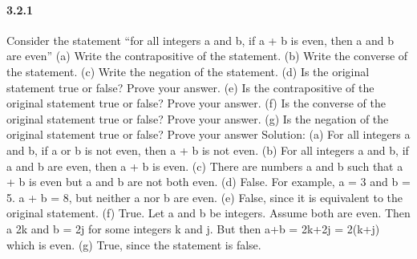 \documentclass{article}
\begin{document}
\paragraph{3.2.1}
Consider the statement “for all integers a and b, if a + b is even, then a
and b are even”\newline
(a) Write the contrapositive of the statement.\newline
(b) Write the converse of the statement.\newline
(c) Write the negation of the statement.\newline
(d) Is the original statement true or false? Prove your answer.\newline
(e) Is the contrapositive of the original statement true or false? Prove
your answer.\newline
(f) Is the converse of the original statement true or false? Prove
your answer.\newline
(g) Is the negation of the original statement true or false? Prove
your answer\newline
Solution:\newline
(a) For all integers a and b, if a or b is not even, then a + b is not even.\newline
(b) For all integers a and b, if a and b are even, then a + b is even.\newline
(c) There are numbers a and b such that a + b is even but a and b are
not both even.\newline
(d) False. For example, a = 3 and b = 5. a + b = 8, but neither a nor b
are even.\newline
(e) False, since it is equivalent to the original statement.\newline
(f) True. Let a and b be integers. Assume both are even. Then a  2k\newline
and b = 2j for some integers k and j. But then a+b = 2k+2j = 2(k+j)
which is even.\newline
(g) True, since the statement is false.
\end{document}
